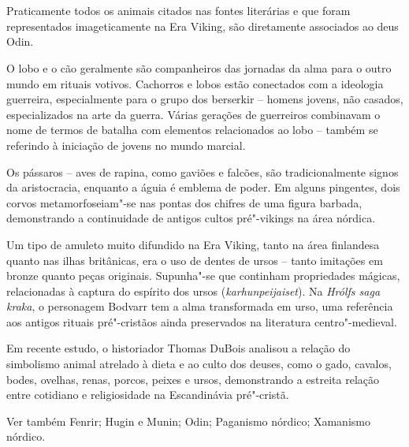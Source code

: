 \section{ }

Praticamente todos os animais citados nas fontes literárias e que foram
representados imageticamente na Era Viking, são diretamente associados
ao deus Odin.

O lobo e o cão geralmente são companheiros das jornadas da alma para o
outro mundo em rituais votivos. Cachorros e lobos estão conectados com a
ideologia guerreira, especialmente para o grupo dos berserkir -- homens
jovens, não casados, especializados na arte da guerra. Várias gerações
de guerreiros combinavam o nome de termos de batalha com elementos
relacionados ao lobo -- também se referindo à iniciação de jovens no
mundo marcial.

Os pássaros -- aves de rapina, como gaviões e falcões, são
tradicionalmente signos da aristocracia, enquanto a águia é emblema de
poder. Em alguns pingentes, dois corvos metamorfoseiam"-se nas pontas dos
chifres de uma figura barbada, demonstrando a continuidade de antigos
cultos pré"-vikings na área nórdica.

Um tipo de amuleto muito difundido na Era Viking, tanto na área
finlandesa quanto nas ilhas britânicas, era o uso de dentes de ursos --
tanto imitações em bronze quanto peças originais. Supunha"-se que
continham propriedades mágicas, relacionadas à captura do espírito dos
ursos (\emph{karhunpeijaiset}). Na \emph{Hrólfs saga kraka}, o
personagem Bodvarr tem a alma transformada em urso, uma referência aos
antigos rituais pré"-cristãos ainda preservados na literatura
centro"-medieval.

Em recente estudo, o historiador Thomas DuBois analisou a relação do
simbolismo animal atrelado à dieta e ao culto dos deuses, como o gado,
cavalos, bodes, ovelhas, renas, porcos, peixes e ursos, demonstrando a
estreita relação entre cotidiano e religiosidade na Escandinávia
pré"-cristã.

Ver também Fenrir; Hugin e Munin; Odin; Paganismo nórdico; Xamanismo
nórdico.



